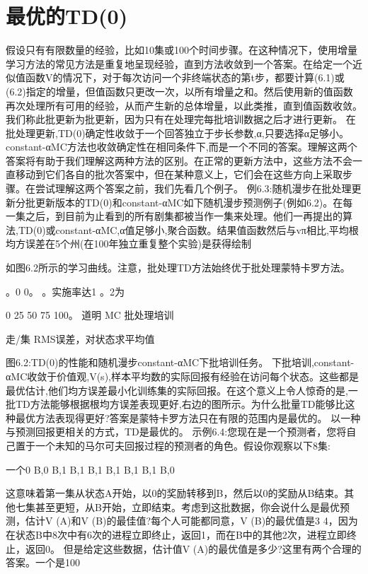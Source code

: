 \section{最优的TD(0)}
假设只有有限数量的经验，比如10集或100个时间步骤。在这种情况下，使用增量学习方法的常见方法是重复地呈现经验，直到方法收敛到一个答案。在给定一个近似值函数V的情况下，对于每次访问一个非终端状态的第t步，都要计算(6.1)或(6.2)指定的增量，但值函数只更改一次，以所有增量之和。然后使用新的值函数再次处理所有可用的经验，从而产生新的总体增量，以此类推，直到值函数收敛。我们称此批更新为批更新，因为只有在处理完每批培训数据之后才进行更新。
在批处理更新,TD(0)确定性收敛于一个回答独立于步长参数,α,只要选择α足够小。constant-αMC方法也收敛确定性在相同条件下,而是一个不同的答案。理解这两个答案将有助于我们理解这两种方法的区别。在正常的更新方法中，这些方法不会一直移动到它们各自的批次答案中，但在某种意义上，它们会在这些方向上采取步骤。在尝试理解这两个答案之前，我们先看几个例子。
例6.3:随机漫步在批处理更新分批更新版本的TD(0)和constant-αMC如下随机漫步预测例子(例如6.2)。在每一集之后，到目前为止看到的所有剧集都被当作一集来处理。他们一再提出的算法,TD(0)或constant-αMC,α值足够小,聚合函数。结果值函数然后与vπ相比,平均根均方误差在5个州(在100年独立重复整个实验)是获得绘制

如图6.2所示的学习曲线。注意，批处理TD方法始终优于批处理蒙特卡罗方法。

。0 0。
。实施率达1
。2为

0 25 50 75 100。
道明
MC
批处理培训

走/集
RMS误差，对状态求平均值

图6.2:TD(0)的性能和随机漫步constant-αMC下批培训任务。
下批培训,constant-αMC收敛于价值观,V(s),样本平均数的实际回报有经验在访问每个状态。这些都是最优估计,他们均方误差最小化训练集的实际回报。在这个意义上令人惊奇的是,一批TD方法能够根据根均方误差表现更好,右边的图所示。为什么批量TD能够比这种最优方法表现得更好?答案是蒙特卡罗方法只在有限的范围内是最优的。
以一种与预测回报更相关的方式，TD是最优的。
示例6.4:您现在是一个预测者，您将自己置于一个未知的马尔可夫回报过程的预测者的角色。假设你观察以下8集:

一个0 B,0 					B,1
B,1 					B,1
B,1 					B,1
B,1 					B,0

这意味着第一集从状态A开始，以0的奖励转移到B，然后以0的奖励从B结束。其他七集甚至更短，从B开始，立即结束。考虑到这批数据，你会说什么是最优预测，估计V (A)和V (B)的最佳值?每个人可能都同意，V (B)的最优值是3 4，因为在状态B中8次中有6次的进程立即终止，返回1，而在B中的其他2次，进程立即终止，返回0。
但是给定这些数据，估计值V (A)的最优值是多少?这里有两个合理的答案。一个是100%



